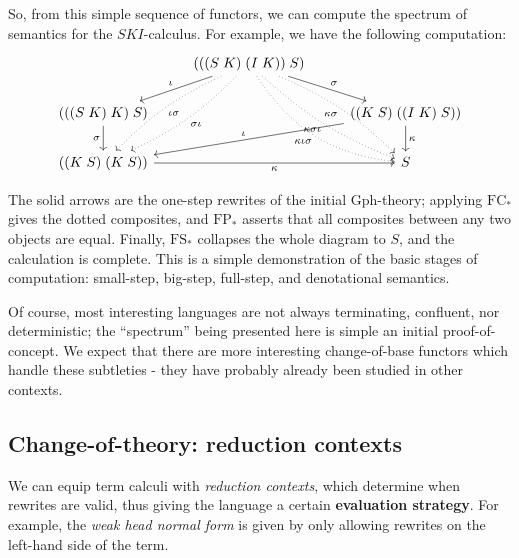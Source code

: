 \documentclass[a4paper,UKenglish]{article}
\theoremstyle{definition}
\newcommand{\Gph}{\mathrm{Gph}}
\newcommand{\FC}{\mathrm{FC}}
\newcommand{\FP}{\mathrm{FP}}
\newcommand{\FS}{\mathrm{FS}}
\begin{document}
So, from this simple sequence of functors, we can compute the spectrum of semantics for the $SKI$-calculus. For example, we have the following computation:
\[\begin{tikzcd}
&	(((S\; K)\; (I\; K))\; S) \arrow[rd,"\sigma"] \arrow[ld,swap,"\iota"] \arrow[ddl,dotted,bend left=10,"\sigma\iota"] \arrow[ddl,dotted,bend right=10,"\iota\sigma"] \arrow[ddr,dotted,swap,bend left=10,"\kappa\sigma"] \arrow[ddr,dotted,bend right=10,swap,"\kappa\sigma\iota"] \arrow[ddr,dotted,swap,bend right=25,"\kappa\iota\sigma"] &\\
(((S\; K)\; K)\; S) \arrow[d,swap,"\sigma"] & & ((K\; S)\; ((I\; K)\; S)) \arrow[lld,swap,"\iota"] \arrow[d,"\kappa"]\\
((K\; S)\; (K\; S)) \arrow[rr,swap,"\kappa"] & & S
\end{tikzcd}\]

The solid arrows are the one-step rewrites of the initial $\Gph$-theory; applying $\FC_*$ gives the dotted composites, and $\FP_*$ asserts that all composites between any two objects are equal. Finally, $\FS_*$ collapses the whole diagram to $S$, and the calculation is complete. This is a simple demonstration of the basic stages of computation: small-step, big-step, full-step, and denotational semantics.

Of course, most interesting languages are not always terminating, confluent, nor deterministic; the ``spectrum'' being presented here is simple an initial proof-of-concept. We expect that there are more interesting change-of-base functors which handle these subtleties - they have probably already been studied in other contexts.

\subsection{Change-of-theory: reduction contexts}
We can equip term calculi with \textit{reduction contexts}, which determine when rewrites are valid, thus giving the language a certain \textbf{evaluation strategy}. For example, the \textit{weak head normal form} is given by only allowing rewrites on the left-hand side of the term.
\end{document}

